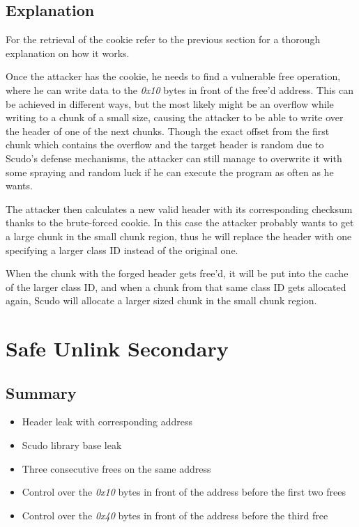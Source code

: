 \documentclass[a4paper,11pt,oneside]{report}
\begin{document}
\subsection{Explanation}

For the retrieval of the cookie refer to the previous section for a thorough explanation
on how it works.

Once the attacker has the cookie, he needs to find a vulnerable free operation, where he
can write data to the \emph{0x10} bytes in front of the free'd address. This can be
achieved in different ways, but the most likely might be an overflow while writing to a
chunk of a small size, causing the attacker to be able to write over the header of one of
the next chunks. Though the exact offset from the first chunk which contains the overflow
and the target header is random due to Scudo's defense mechanisms, the attacker can still
manage to overwrite it with some spraying and random luck if he can execute the program as
often as he wants.

The attacker then calculates a new valid header with its corresponding checksum thanks to
the brute-forced cookie. In this case the attacker probably wants to get a large chunk in
the small chunk region, thus he will replace the header with one specifying a larger class
ID instead of the original one.


When the chunk with the forged header gets free'd, it will be put into the cache of the
larger class ID, and when a chunk from that same class ID gets allocated again, Scudo will
allocate a larger sized chunk in the small chunk region.

\section{Safe Unlink Secondary}


\subsection{Summary}

\begin{itemize}
\item Header leak with corresponding address
\item Scudo library base leak
\item Three consecutive frees on the same address
\item Control over the \emph{0x10} bytes in front of the address before the first two
  frees
\item Control over the \emph{0x40} bytes in front of the address before the third free
\end{itemize}
\end{document}
